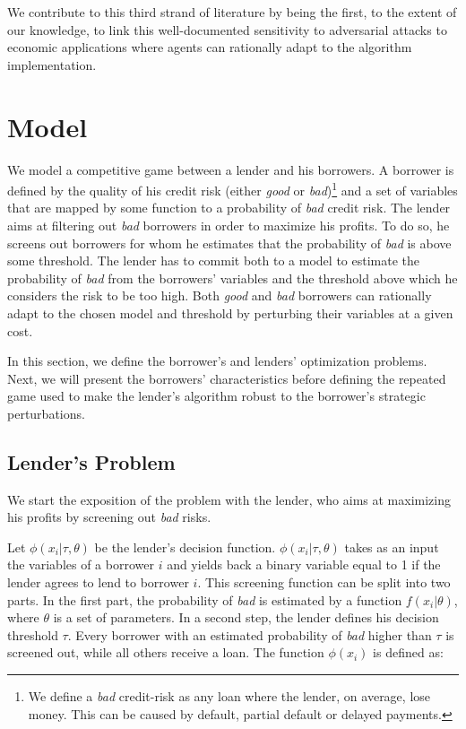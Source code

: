 \documentclass[12pt]{article} %
\begin{document}
We contribute to this third strand of literature by being the first, to the extent of our knowledge, to link this well-documented sensitivity to adversarial attacks to economic applications where agents can rationally adapt to the algorithm implementation. 
 

\section{Model}
\label{sec:model}
We model a competitive game between a lender and his borrowers. A borrower is defined by the quality of his credit risk (either \textit{good} or \textit{bad})\footnote{We define a \textit{bad} credit-risk as any loan where the lender, on average, lose money.  This can be caused by default, partial default or delayed payments.}
 and a set of variables that are mapped by some function to a probability of \textit{bad} credit risk. 
The lender aims at filtering out \textit{bad} borrowers in order to maximize his profits.
To do so, he screens out borrowers for whom he estimates that the probability of \textit{bad} is above some threshold. The lender has to commit both to a model to estimate the probability of \textit{bad} from the borrowers' variables and the threshold above which he considers the risk to be too high. Both \textit{good} and \textit{bad} borrowers can rationally adapt to the chosen model and threshold by perturbing their variables at a given cost. 

In this section, we define the borrower's and lenders' optimization problems. Next, we will present the borrowers' characteristics before defining the repeated game used to make the lender's algorithm robust to the borrower's strategic perturbations. 


\subsection{Lender's Problem}
We start the exposition of the problem with the lender, who aims at maximizing his profits by screening out \textit{bad} risks. 

Let $\phi(x_i|\tau,\theta)$ be the lender's decision function. $\phi(x_i|\tau,\theta)$ takes as an input the variables of a borrower $i$ and yields back a binary variable equal to 1 if the lender agrees to lend to borrower $i$. This screening function can be split into two parts. In the first part, the probability of \textit{bad} is estimated by a function $f(x_i | \theta)$, where $\theta$ is a set of parameters. In a second step, the lender defines his decision threshold $\tau$. Every borrower with an estimated probability of \textit{bad} higher than $\tau$ is screened out, while all others receive a loan. The function $\phi(x_i)$ is defined as: 
\end{document}
